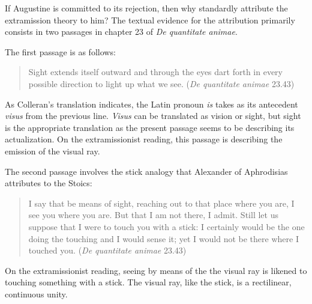 \documentclass[12pt]{article}
\begin{document}
If Augustine is committed to its rejection, then why standardly attribute the extramission theory to him? The textual evidence for the attribution primarily consists in two passages in chapter 23 of \emph{De quantitate animae}.

The first passage is as follows:
\begin{quote}
	
	Sight extends itself outward and through the eyes dart forth in every possible direction to light up what we see. (\emph{De quantitate animae} 23.43)
\end{quote}
As Colleran's translation indicates, the Latin pronoun \emph{is} takes as its antecedent \emph{visus} from the previous line. \emph{Visus} can be translated as vision or sight, but sight is the appropriate translation as the present passage seems to be describing its actualization. On the extramissionist reading, this passage is describing the emission of the visual ray.

The second passage involves the stick analogy that Alexander of Aphrodisias attributes to the Stoics:
\begin{quote}
	
	I say that be means of sight, reaching out to that place where you are, I see you where you are. But that I am not there, I admit. Still let us suppose that I were to touch you with a stick: I certainly would be the one doing the touching and I would sense it; yet I would not be there where I touched you. (\emph{De quantitate animae} 23.43) 
\end{quote}
On the extramissionist reading, seeing by means of the the visual ray is likened to touching something with a stick. The visual ray, like the stick, is a rectilinear, continuous unity.

\end{document}
